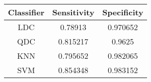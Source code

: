\begin{tabular}{|c|c|c|}
 \hline 
Classifier & Sensitivity & Specificity \\ 
 \hline 
LDC & 0.78913 & 0.970652 \\ 
 \hline 
QDC & 0.815217 & 0.9625 \\ 
 \hline 
KNN & 0.795652 & 0.982065 \\ 
 \hline 
SVM & 0.854348 & 0.983152 \\ 
 \hline 
\end{tabular}